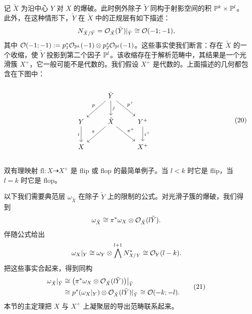记 $\tilde X$ 为沿中心 $Y$ 对 $X$ 的爆破。此时例外除子 $\tilde Y$ 同构于射影空间的积 $\mathbb{P}^k\times\mathbb{P}^l$。此外，在这种情形下，$\tilde Y$ 在 $\tilde X$ 中的正规层有如下描述：
\[
N_{\tilde X/\tilde Y}=\mathcal{O}_{\tilde X}(\tilde Y)|_{\tilde Y}\cong\mathcal{O}(-1;-1),
\]
其中 $\mathcal{O}(-1;-1):=p_1^*\mathcal{O}_{\mathbb{P}^k}(-1)\otimes p_2^*\mathcal{O}_{\mathbb{P}^l}(-1)$。这些事实使我们断言：存在 $\tilde X$ 的一个收缩，使 $\tilde Y$ 投影到第二个因子 $\mathbb{P}^l$。该收缩存在于解析范畴中，其结果是一个光滑簇 $X^+$，它一般可能不是代数的。我们假设 $X^+$ 是代数的。上面描述的几何都包含在下图中：
\begin{equation}
\parbox{0.92\linewidth}{\centering\diag{
\& \tilde Y \arrow[dl,"p"'] \arrow[d,"j"] \arrow[dr,"p^+"] \& \\
Y \arrow[d,"i"'] \& \tilde X \arrow[dl,"\pi"'] \arrow[dr,"\pi^+"] \& Y^+ \arrow[d,"i^+"] \\
X \& \& X^+
}}
\tag{20}
\end{equation}

双有理映射 $\mathrm{fl}:X\dashrightarrow X^+$ 是 flip 或 flop 的最简单例子。当 $l<k$ 时它是 flip，当 $l=k$ 时它是 flop。



以下我们需要典范层 $\omega_{\tilde X}$ 在除子 $\tilde Y$ 上的限制的公式。对光滑子簇的爆破，我们得到
\[
\omega_{\tilde X}\cong\pi^*\omega_X\otimes\mathcal{O}_{\tilde X}(l\tilde Y).
\]
伴随公式给出
\[
\omega_X|_Y\cong\omega_Y\otimes\bigwedge^{l+1}N^*_{X/Y}\cong\mathcal{O}_Y(l-k).
\]
把这些事实合起来，得到同构
\begin{equation}
\begin{aligned}
\omega_{\tilde X}|_{\tilde Y}&\cong\bigl(\pi^*\omega_X\otimes\mathcal{O}_{\tilde X}(l\tilde Y)\bigr)\big|_{\tilde Y}\\
&\cong p^*(\omega_X|_Y)\otimes\mathcal{O}_{\tilde X}(l\tilde Y)|_{\tilde Y}\cong\mathcal{O}(-k;-l).
\end{aligned}
\tag{21}
\end{equation}
本节的主定理把 $X$ 与 $X^+$ 上凝聚层的导出范畴联系起来。

